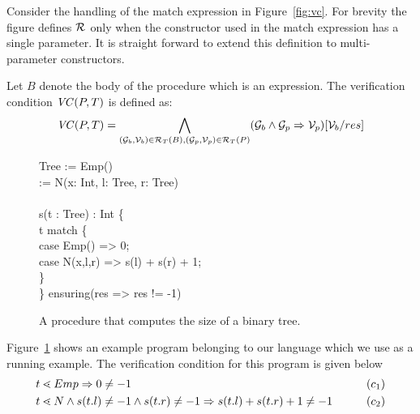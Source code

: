 Consider the handling of the match expression in Figure~\ref{fig:vc}. 
For brevity the figure defines $\mathcal{R}_{}$ only when the constructor used in the match 
expression has a single parameter. 
It is straight forward to extend this definition to multi-parameter constructors.

Let $B$ denote the body of the procedure which is an expression.
The verification condition $\mathit{VC}(P,T)$ is defined as: 
%
\begin{align}
\mathit{VC}(P,T) = \bigwedge_{(\mathcal{G}_b,\mathcal{V}_b) \in \mathcal{R}_{T}(B), (\mathcal{G}_p,\mathcal{V}_p) \in \mathcal{R}_{T}(P)} 
(\mathcal{G}_b \wedge \mathcal{G}_p \Rightarrow \mathcal{V}_p)[\mathcal{V}_b/res]
\end{align}
%
\begin{figure}
\begin{myprogram}
Tree := Emp() \\
\> \>   :=  N(x: Int, l: Tree, r: Tree) \\     
\\
s(t : Tree) : Int \{ \\
\pnl \> t match \{ \\
\pnl \> case Emp() => 0; \\
\pnl \> case N(x,l,r) => s(l) + s(r) + 1; \\
\> \} \\
\} ensuring(res => res != -1)
\end{myprogram}
\caption{A procedure that computes the size of a binary tree.} \label{fig:eg}
\end{figure}
%
Figure~\ref{fig:eg} shows an example program belonging to our language which we use as a running example.
The verification condition for this program is given below
%
\begin{align*}
& t \lessdot Emp \Rightarrow 0 \ne -1 & \qquad (c_1)\\
& t \lessdot N \wedge s(t.l) \ne -1 \wedge s(t.r) \ne -1 \Rightarrow s(t.l) + s(t.r) + 1 \ne -1 & \qquad (c_2) 
\end{align*}


%
%
%


